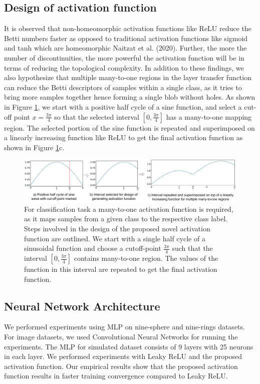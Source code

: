 \documentclass[wcp]{jmlr}
\begin{document}
\subsection{Design of activation function} \label{sec:design_of_activation_function}
It is observed that non-homeomorphic activation functions like ReLU reduce the Betti numbers faster as opposed to traditional  activation functions like sigmoid and tanh which are  homeomorphic Naitzat et al. (2020). Further, the more the number of discontinuities, the more powerful the activation function will be in terms of reducing the topological complexity. In addition to these findings, we also hypothesize that multiple many-to-one regions in the layer transfer function can reduce the Betti descriptors  of samples within a single class, as it tries to bring more samples together hence forming a single blob without holes. As shown in Figure \ref{fig:activation_function_design}, we start with  a positive half cycle of a sine function, and select a cut-off point $x=\frac{3\pi}{4}$ so that the selected interval $[0,\frac{3\pi}{4}]$ has a many-to-one mapping region. The selected portion of the sine function is repeated and superimposed on a linearly increasing function like ReLU to get the final activation function as shown in  Figure \ref{fig:activation_function_design}c.

\begin{figure}[htp]
\begin{center}
\includegraphics[width=\textwidth]{images/activation_function_design.pdf}
\caption{For classification task a many-to-one activation function is required, as it maps samples from a given class to the respective class label. Steps involved in the design of the proposed novel activation function are outlined. We start with a single half cycle of a sinusoidal function and choose a cutoff-point $\frac{3\pi}{4}$ such that the interval $[0,\frac{3\pi}{4}]$ contains many-to-one region. The values of the function in this interval are repeated to get the final activation function.}
\label{fig:activation_function_design}
\end{center}
\end{figure}

\subsection{Neural Network Architecture}
We performed experiments using MLP  on nine-sphere and nine-rings datasets. For image datasets, we used Convolutional Neural Networks for running the experiments. The MLP for simulated dataset consists of 9 layers with 25 neurons in each layer. We performed experiments with Leaky ReLU and the proposed activation function. Our empirical results show that the proposed activation function results in faster training convergence compared to Leaky ReLU.
\end{document}
